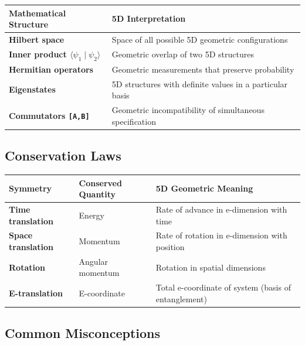 \documentclass[aps,prd,preprint,superscriptaddress,longbibliography,floatfix]{revtex4-2}
\theoremstyle{remark}
\begin{document}
\begin{table}[H]
\begin{ruledtabular}
\begin{tabular}{p{7.5cm}p{7.5cm}}
Mathematical Structure & 5D Interpretation \\
\hline
\textbf{Hilbert space} & Space of all possible 5D geometric configurations \\
\textbf{Inner product $\langle\psi_{1} \mid \psi_{2}\rangle$} & Geometric overlap of two 5D structures \\
\textbf{Hermitian operators} & Geometric measurements that preserve probability \\
\textbf{Eigenstates} & 5D structures with definite values in a particular basis \\
\textbf{Commutators \texttt{[A,B]}} & Geometric incompatibility of simultaneous specification \\
\end{tabular}
\end{ruledtabular}
\end{table}


\subsection{Conservation Laws}


\begin{table}[H]
\begin{ruledtabular}
\begin{tabular}{p{5.0cm}p{5.0cm}p{5.0cm}}
Symmetry & Conserved Quantity & 5D Geometric Meaning \\
\hline
\textbf{Time translation} & Energy & Rate of advance in e-dimension with time \\
\textbf{Space translation} & Momentum & Rate of rotation in e-dimension with position \\
\textbf{Rotation} & Angular momentum & Rotation in spatial dimensions \\
\textbf{E-translation} & E-coordinate & Total e-coordinate of system (basis of entanglement) \\
\end{tabular}
\end{ruledtabular}
\end{table}


\subsection{Common Misconceptions}
\end{document}
